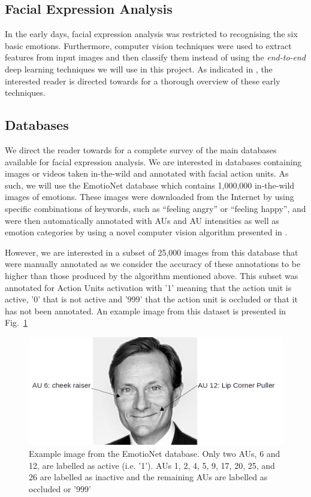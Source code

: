 \documentclass[12pt,twoside]{article}
\begin{document}
\subsection{Facial Expression Analysis}

In the early days, facial expression analysis was restricted to recognising the six basic emotions. Furthermore, computer vision techniques were used to extract features from input images and then classify them instead of using the \textit{end-to-end} deep learning techniques we will use in this project. As indicated in \cite{RefWorks:2}, the interested reader is directed towards \cite{RefWorks:18,RefWorks:19} for a thorough overview of these early techniques.

\subsection{Databases}

We direct the reader towards \cite{RefWorks:2} for a complete survey of the
main databases available for facial expression analysis. We are interested in
databases containing images or videos taken in-the-wild and annotated with
facial action units. As such, we will use the EmotioNet \cite{RefWorks:1}
database which contains 1,000,000 in-the-wild images of emotions. These images
were downloaded from the Internet by using specific combinations of keywords,
such as ``feeling angry'' or ``feeling happy'',
and were then automatically annotated with AUs and AU intensities as well as
emotion categories by using a novel computer vision algorithm presented in
\cite{RefWorks:1}.

However, we are interested in a subset of 25,000 images from this database that
were manually annotated as we consider the accuracy of these annotations to be
higher than those produced by the algorithm mentioned above. This subset was
annotated for Action Units activation with '1' meaning that the action unit is
active, '0' that is not active and '999' that the action unit is occluded or
that it has not been annotated. An example image from this dataset is
presented in Fig.~\ref{fig:emotionet_example}

\begin{figure}[ht]
  \centering
  \includegraphics[scale=0.7]{./figures/emotionet_example.png}
  \caption{Example image from the EmotioNet database. Only two AUs, 6 and 12,
  are labelled as active (i.e. '1'). AUs 1, 2, 4, 5, 9, 17, 20, 25, and 26
are labelled as inactive and the remaining AUs are labelled as occluded or '999'}
  \label{fig:emotionet_example}
\end{figure}
\end{document}

